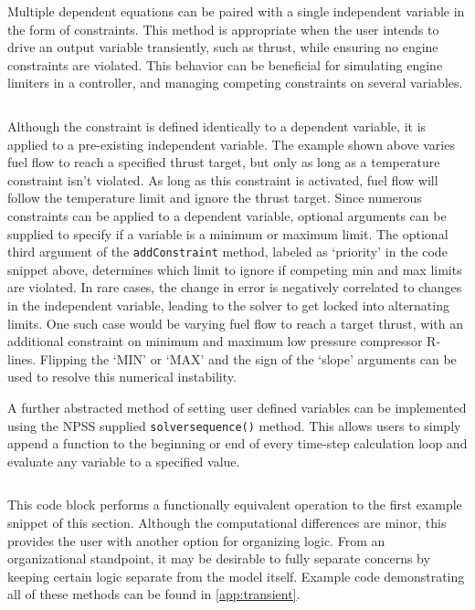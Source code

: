 \documentclass[heading.tex]{subfiles}
\begin{document}
Multiple dependent equations can be paired with a single independent variable in the form of constraints.
This method is appropriate when the user intends to drive an output variable transiently,
such as thrust, while ensuring no engine constraints are violated.
This behavior can be beneficial for simulating engine limiters in a controller, and managing 
competing constraints on several variables.
 
 \begin{adjustwidth}{1cm}{-1cm}
 \inputminted[]{c++}{code/constraintSetup}
 \end{adjustwidth} 
 
Although the constraint is defined identically to a dependent variable, it is applied to a pre-existing independent variable.
The example shown above varies fuel flow to reach a specified thrust target, but only as long as a temperature constraint isn't violated.
As long as this constraint is activated, fuel flow will follow the temperature limit and ignore the thrust target.
Since numerous constraints can be applied to a dependent variable,
optional arguments can be supplied to specify if a variable is a minimum or maximum limit.
The optional third argument of the \texttt{addConstraint} method, labeled as `priority' in the code snippet above,
determines which limit to ignore if competing min and max limits are violated.
In rare cases, the change in error is negatively correlated to changes in the independent variable,
leading to the solver to get locked into alternating limits. One such case would be varying fuel flow to reach a target thrust,
with an additional constraint on minimum and maximum low pressure compressor R-lines.
Flipping the `MIN' or `MAX' and the sign of the `slope' arguments can be used to resolve this numerical instability.

A further abstracted method of setting user defined variables can be implemented using the NPSS supplied 
\texttt{solversequence()} method.
This allows users to simply append a function to the beginning or end of every time-step calculation loop
and evaluate any variable to a specified value. 
 
 \begin{adjustwidth}{-1cm}{-1cm}
 \inputminted[]{c++}{code/solverSequence}
 \end{adjustwidth} 
 
This code block performs a functionally equivalent operation to the first example snippet of this section.
Although the computational differences are minor, this provides the user with another option for organizing logic.
From an organizational standpoint,
it may be desirable to fully separate concerns by keeping certain logic separate from the model itself.
Example code demonstrating all of these methods can be found in \cref{app:transient}.
\end{document}
